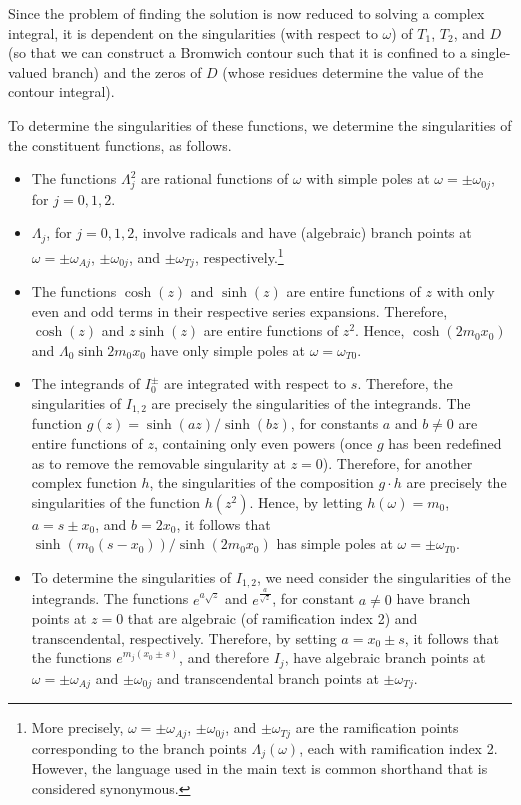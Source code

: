 \documentclass[12pt]{../style-files/ociamthesis}
\begin{document}
Since the problem of finding the solution is now reduced to solving a complex integral, it is dependent on the singularities (with respect to $\omega$) of $T_1$, $T_2$, and $D$ (so that we can construct a Bromwich contour such that it is confined to a single-valued branch) and the zeros of $D$ (whose residues determine the value of the contour integral).

To determine the singularities of these functions, we determine the singularities of the constituent functions, as follows.
\begin{itemize}
	\item The functions $\Lambda_j^2$ are rational functions of $\omega$ with simple poles at $\omega = \pm \omega_{0j}$, for $j = 0, 1, 2$.
	
	\item $\Lambda_j$, for $j = 0, 1, 2$, involve radicals and have (algebraic) branch points at $\omega = \pm \omega_{Aj}$, $\pm \omega_{0j}$, and $\pm \omega_{Tj}$, respectively.\footnote{More precisely, $\omega = \pm \omega_{Aj}$, $\pm \omega_{0j}$, and $\pm \omega_{Tj}$ are the ramification points corresponding to the branch points $\Lambda_j(\omega)$, each with ramification index 2. However, the language used in the main text is common shorthand that is considered synonymous.}
	
	\item The functions $\cosh(z)$ and $\sinh(z)$ are entire functions of $z$ with only even and odd terms in their respective series expansions. Therefore, $\cosh(z)$ and $z\sinh(z)$ are entire functions of $z^2$. Hence, $\cosh(2m_0x_0)$ and $\Lambda_0\sinh{2m_0x_0}$ have only simple poles at $\omega = \omega_{T0}$.
	
	\item The integrands of $I_0^\pm$ are integrated with respect to $s$. Therefore, the singularities of $I_{1,2}$ are precisely the singularities of the integrands. The function $g(z) = \sinh(az) / \sinh(bz)$, for constants $a$ and $b \neq 0$ are entire functions of $z$, containing only even powers (once $g$ has been redefined as to remove the removable singularity at $z = 0$). Therefore, for another complex function $h$, the singularities of the composition $g \cdot h$ are precisely the singularities of the function $h(z^2)$. Hence, by letting $h(\omega) = m_0$, $a = s \pm x_0$, and $b = 2x_0$, it follows that $\sinh(m_0(s - x_0)) / \sinh(2m_0x_0)$ has simple poles at $\omega = \pm \omega_{T0}$.
	
	\item To determine the singularities of $I_{1,2}$, we need consider the singularities of the integrands. The functions $e^{a\sqrt{z}}$ and $e^{\frac{a}{\sqrt{z}}}$, for constant $a \neq 0$ have branch points at $z = 0$ that are algebraic (of ramification index 2) and transcendental, respectively. Therefore, by setting $a = x_0 \pm s$, it follows that the functions $e^{m_j(x_0 \pm s)}$, and therefore $I_j$, have algebraic branch points at $\omega = \pm \omega_{Aj}$ and $\pm \omega_{0j}$ and transcendental branch points at $\pm \omega_{Tj}$.
\end{itemize}
\end{document}
